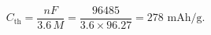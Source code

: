 \documentclass[preview]{standalone}
\begin{document}
\[C_\text{th} = \frac{nF}{3.6\,M} = \frac{96485}{3.6 \times 96.27} = 278 \text{ mAh/g}.\]
\end{document}
